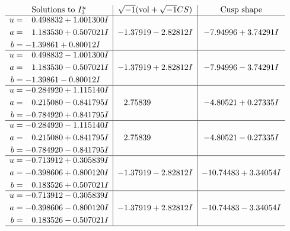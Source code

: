 \documentclass[1p]{elsarticle_modified}
\theoremstyle{definition}
\newcommand{\I}{\sqrt{-1}}
\begin{document}
$$\begin{array}{c|c|c}  
\text{Solutions to }I^u_{3}& \I (\text{vol} + \sqrt{-1}CS) & \text{Cusp shape}\\
 \hline 
\begin{aligned}
u &= \phantom{-}0.498832 + 1.001300 I \\
a &= \phantom{-}1.183530 + 0.507021 I \\
b &= -1.39861 + 0.80012 I\end{aligned}
 & -1.37919 - 2.82812 I & -7.94996 + 3.74291 I \\ \hline\begin{aligned}
u &= \phantom{-}0.498832 - 1.001300 I \\
a &= \phantom{-}1.183530 - 0.507021 I \\
b &= -1.39861 - 0.80012 I\end{aligned}
 & -1.37919 + 2.82812 I & -7.94996 - 3.74291 I \\ \hline\begin{aligned}
u &= -0.284920 + 1.115140 I \\
a &= \phantom{-}0.215080 - 0.841795 I \\
b &= -0.784920 + 0.841795 I\end{aligned}
 & \phantom{-}2.75839\phantom{ +0.000000I} & -4.80521 + 0.27335 I \\ \hline\begin{aligned}
u &= -0.284920 - 1.115140 I \\
a &= \phantom{-}0.215080 + 0.841795 I \\
b &= -0.784920 - 0.841795 I\end{aligned}
 & \phantom{-}2.75839\phantom{ +0.000000I} & -4.80521 - 0.27335 I \\ \hline\begin{aligned}
u &= -0.713912 + 0.305839 I \\
a &= -0.398606 + 0.800120 I \\
b &= \phantom{-}0.183526 + 0.507021 I\end{aligned}
 & -1.37919 - 2.82812 I & -10.74483 + 3.34054 I \\ \hline\begin{aligned}
u &= -0.713912 - 0.305839 I \\
a &= -0.398606 - 0.800120 I \\
b &= \phantom{-}0.183526 - 0.507021 I\end{aligned}
 & -1.37919 + 2.82812 I & -10.74483 - 3.34054 I\\
 \hline 
 \end{array}$$\newpage
\end{document}
